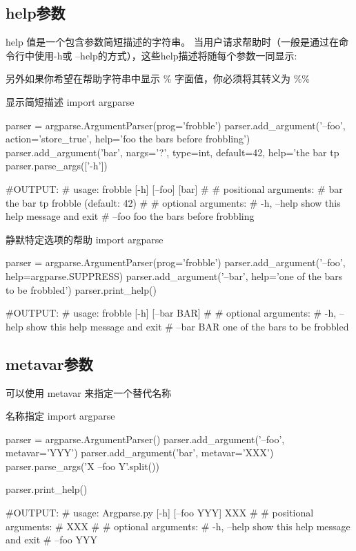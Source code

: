\documentclass[11pt]{article}
\begin{document}
\subsection{help参数}
help 值是一个包含参数简短描述的字符串。 当用户请求帮助时（一般是通过在命令行中使用-h或 --help的方式），这些help描述将随每个参数一同显示:

另外如果你希望在帮助字符串中显示 \% 字面值，你必须将其转义为 \%\%
\begin{Python}{显示简短描述}
import argparse

parser = argparse.ArgumentParser(prog='frobble')
parser.add_argument('--foo', action='store_true',
help='foo the bars before frobbling')
parser.add_argument('bar', nargs='?', type=int, default=42,
help='the bar tp %
parser.parse_args(['-h'])

#OUTPUT:
#       usage: frobble [-h] [--foo] [bar]
# 
#       positional arguments:
#           bar         the bar tp frobble (default: 42)
# 
#       optional arguments:
#           -h, --help  show this help message and exit
#           --foo       foo the bars before frobbling
\end{Python}
\begin{Python}{静默特定选项的帮助}
import argparse

parser = argparse.ArgumentParser(prog='frobble')
parser.add_argument('--foo', help=argparse.SUPPRESS)
parser.add_argument('--bar', help='one of the bars to be frobbled')
parser.print_help()

#OUTPUT:
#       usage: frobble [-h] [--bar BAR]
#
#       optional arguments:
#           -h, --help  show this help message and exit
#           --bar BAR   one of the bars to be frobbled
\end{Python}
\subsection{metavar参数}
可以使用 metavar 来指定一个替代名称
\begin{Python}{名称指定}
import argparse

parser = argparse.ArgumentParser()
parser.add_argument('--foo', metavar='YYY')
parser.add_argument('bar', metavar='XXX')
parser.parse_args('X --foo Y'.split())

parser.print_help()

#OUTPUT:
#       usage: Argparse.py [-h] [--foo YYY] XXX
# 
#       positional arguments:
#           XXX
# 
#       optional arguments:
#           -h, --help  show this help message and exit
#           --foo YYY
\end{Python}
\end{document}
